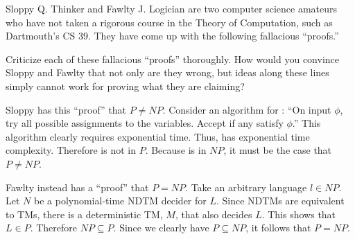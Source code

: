 \begin{problem}
  Sloppy Q. Thinker and Fawlty J. Logician are two computer science
  amateurs who have not taken a rigorous course in the Theory of Computation,
  such as Dartmouth’s CS 39.
  They have come up with the following fallacious ``proofs.''

  Criticize each of these fallacious ``proofs'' thoroughly.
  How would you convince Sloppy and Fawlty that not only are they wrong,
  but ideas along these lines simply cannot work for proving what they are claiming?

  \begin{enumalph}
    \item Sloppy has this ``proof'' that $P \neq NP$.
      Consider an algorithm for \SAT:
      ``On input $\phi$, try all possible assignments to the variables.
      Accept if any satisfy $\phi$.''
      This algorithm clearly requires exponential time.
      Thus, \SAT has exponential time complexity.
      Therefore \SAT is not in $P$.
      Because \SAT is in $NP$, it must be the case that $P \neq NP$.
    \item Fawlty instead has a ``proof'' that $P = NP$.
      Take an arbitrary language $l \in NP$.
      Let $N$ be a polynomial-time NDTM decider for $L$.
      Since NDTMs are equivalent to TMs, there is a deterministic TM, $M$,
      that also decides $L$.
      This shows that $L \in P$. Therefore $NP \subseteq P$.
      Since we clearly have $P \subseteq NP$, it follows that $P = NP$.
  \end{enumalph}
\end{problem}
